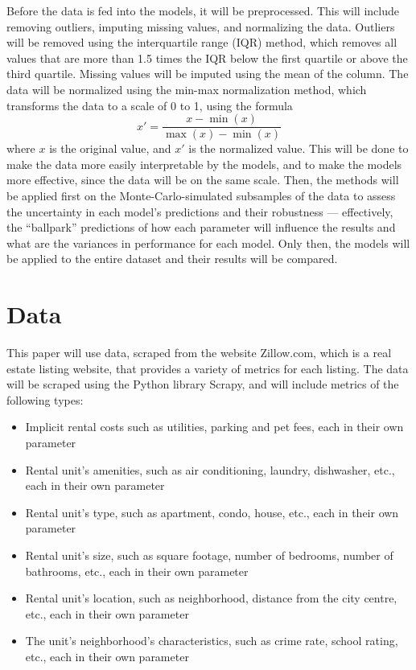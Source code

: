 \documentclass[12pt]{report}
\begin{document}
Before the data is fed into the models, it will be preprocessed. This will include removing outliers, imputing missing values, and normalizing the data. Outliers will be removed using the interquartile range (IQR) method, which removes all values that are more than 1.5 times the IQR below the first quartile or above the third quartile. Missing values will be imputed using the mean of the column. The data will be normalized using the min-max normalization method, which transforms the data to a scale of 0 to 1, using the formula
\begin{equation}
	x' = \frac{x - \min(x)}{\max(x) - \min(x)}
\end{equation}
where $x$ is the original value, and $x'$ is the normalized value. This will be done to make the data more easily interpretable by the models, and to make the models more effective, since the data will be on the same scale. Then, the methods will be applied first on the Monte-Carlo-simulated subsamples of the data to assess the uncertainty in each model's predictions and their robustness --- effectively, the ``ballpark'' predictions of how each parameter will influence the results and what are the variances in performance for each model. Only then, the models will be applied to the entire dataset and their results will be compared.

\section{Data}
This paper will use data, scraped from the website Zillow.com, which is a real estate listing website, that provides a variety of metrics for each listing. The data will be scraped using the Python library Scrapy, and will include metrics of the following types:
\begin{itemize}
	\item Implicit rental costs such as utilities, parking and pet fees, each in their own parameter
	\item Rental unit's amenities, such as air conditioning, laundry, dishwasher, etc., each in their own parameter
	\item Rental unit's type, such as apartment, condo, house, etc., each in their own parameter
	\item Rental unit's size, such as square footage, number of bedrooms, number of bathrooms, etc., each in their own parameter
	\item Rental unit's location, such as neighborhood, distance from the city centre, etc., each in their own parameter
	\item The unit's neighborhood's characteristics, such as crime rate, school rating, etc., each in their own parameter
\end{itemize}
\end{document}
